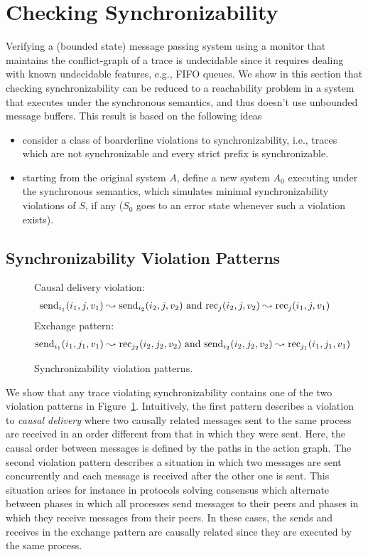 \section{Checking Synchronizability}


Verifying a (bounded state) message passing system using a monitor that maintains the conflict-graph of a trace 
is undecidable since it requires dealing with known undecidable features, e.g., FIFO queues.
We show in this section that checking synchronizability can be reduced 
to a reachability problem in a system that executes under the synchronous semantics, and 
thus doesn't use unbounded message buffers. This result is based on the following ideas
\begin{itemize}
	\item consider a class of boarderline violations to synchronizability, i.e., traces which
are not synchronizable and every strict prefix is synchronizable.
	\item starting from the original system $A$, define a new system $A_0$ executing under
the synchronous semantics, which simulates minimal synchronizability violations of
$S$, if any ($S_0$ goes to an error state whenever such a violation exists).
\end{itemize}

\subsection{Synchronizability Violation Patterns}


\begin{figure}[t]
Causal delivery violation:
\begin{align*}
\mathrm{send}_{i_1}({i_1,j,v_1})\leadsto \mathrm{send}_{i_2}({i_2,j,v_2})\mbox{ and }
\mathrm{rec}_{j}({i_2,j,v_2}) \leadsto \mathrm{rec}_{j}({i_1,j,v_1}) 
\end{align*}
Exchange pattern:
\begin{align*}
\mathrm{send}_{i_1}({i_1,j_1,v_1})\leadsto \mathrm{rec}_{j_2}({i_2,j_2,v_2})\mbox{ and }
\mathrm{send}_{i_2}({i_2,j_2,v_2})\leadsto \mathrm{rec}_{j_1}({i_1,j_1,v_1})
\end{align*}
\caption{Synchronizability violation patterns.}
\label{fig:patterns}
\end{figure}

We show that any trace violating synchronizability contains one of the two violation patterns in Figure~\ref{fig:patterns}.
Intuitively, the first pattern describes a violation to \emph{causal delivery} where two causally related messages sent to the same process
are received in an order different from that in which they were sent. Here, the causal order between messages is defined
by the paths in the action graph. The second violation pattern describes a situation in which two messages are sent concurrently 
and each message is received after the other one is sent. This situation arises for instance in protocols solving consensus which alternate
between phases in which all processes send messages to their peers and phases in which they receive messages from their peers. 
In these cases, the sends and receives in the exchange pattern are causally related since they are executed by the same process.

